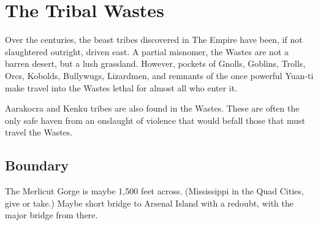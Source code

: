 \section{The Tribal Wastes}

Over the centuries, the beast tribes discovered in The Empire have been,
 if not slaughtered outright, driven east.
A partial misnomer, the Wastes are not a barren desert, but a lush grassland.
However, pockets of Gnolls, Goblins, Trolls, Orcs, Kobolds, Bullywugs, Lizardmen, and
 remnants of the once powerful Yuan-ti make travel into the Wastes lethal for almost
 all who enter it.

Aarakocra and Kenku tribes are also found in the Wastes.
These are often the only safe haven from an onslaught of violence that would befall those
 that must travel the Wastes.

\subsection{Boundary}
The Merlicut Gorge is maybe 1,500 feet across.
(Mississippi in the Quad Cities, give or take.)
Maybe short bridge to Arsenal Island with a redoubt, with the major bridge from there.
